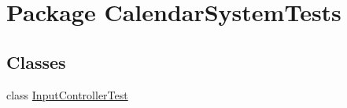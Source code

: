 \hypertarget{namespace_calendar_system_tests}{\section{Package Calendar\+System\+Tests}
\label{namespace_calendar_system_tests}
}
\subsection*{Classes}
\begin{DoxyCompactItemize}
\item 
class \hyperlink{class_calendar_system_tests_1_1_input_controller_test}{Input\+Controller\+Test}
\end{DoxyCompactItemize}
